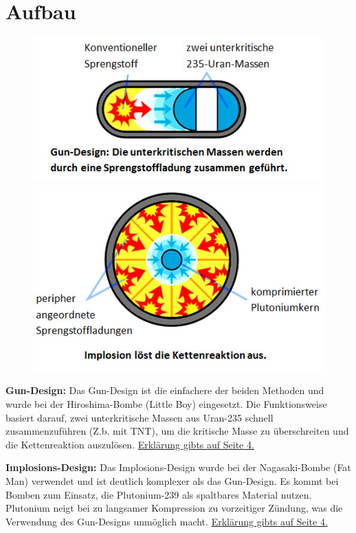 \documentclass[a4paper,12pt]{article}
\begin{document}
\section{Aufbau}
\begin{figure}
    \vspace{-1cm}
    \centering
    \includegraphics[scale=0.7]{Gun.png}
    \includegraphics[scale=0.7]{Implosion.png}
\end{figure}

\textbf{Gun-Design:}
Das Gun-Design ist die einfachere der beiden Methoden und wurde bei der Hiroshima-Bombe (Little Boy) eingesetzt. Die Funktionsweise basiert darauf, 
zwei unterkritische Massen aus Uran-235 schnell zusammenzuführen (Z.b. mit TNT), um die kritische Masse zu überschreiten und die Kettenreaktion auszulösen. \hyperlink{gun_section}{Erklärung gibts auf Seite 4.}

\vspace*{2cm}

\noindent\textbf{Implosions-Design:}
Das Implosions-Design wurde bei der Nagasaki-Bombe (Fat Man) verwendet und ist deutlich komplexer als das Gun-Design. Es kommt bei Bomben zum Einsatz, die Plutonium-239 als spaltbares Material nutzen. 
Plutonium neigt bei zu langsamer Kompression zu vorzeitiger Zündung, was die Verwendung des Gun-Designs unmöglich macht. \hyperlink{implosion_section}{Erklärung gibts auf Seite 4.}
\end{document}
